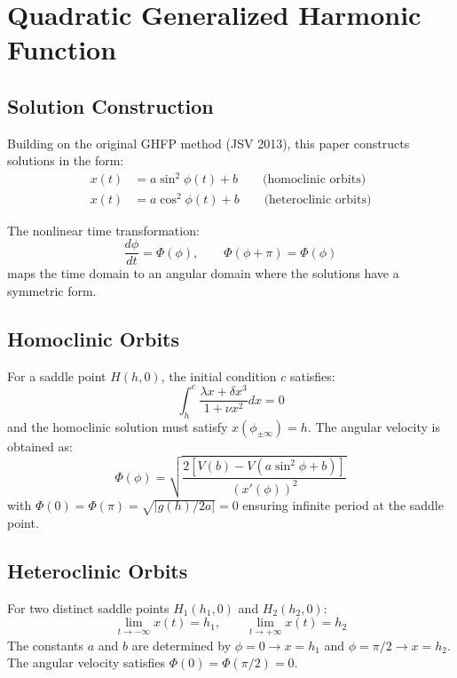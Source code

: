 \documentclass[11pt,a4paper]{article}
\begin{document}
\section{Quadratic Generalized Harmonic Function}

\subsection{Solution Construction}

Building on the original GHFP method (JSV 2013), this paper constructs solutions in the form:
\begin{align}
x(t) &= a\sin^2\phi(t) + b \qquad \text{(homoclinic orbits)}\\
x(t) &= a\cos^2\phi(t) + b \qquad \text{(heteroclinic orbits)}
\label{eq:construction}
\end{align}

The nonlinear time transformation:
\begin{equation}
\frac{d\phi}{dt} = \Phi(\phi), \qquad \Phi(\phi + \pi) = \Phi(\phi)
\label{eq:NTT}
\end{equation}
maps the time domain to an angular domain where the solutions have a symmetric form.

\subsection{Homoclinic Orbits}

For a saddle point $H(h,0)$, the initial condition $c$ satisfies:
\begin{equation}
\int_h^c \frac{\lambda x + \delta x^3}{1 + \nu x^2} dx = 0
\label{eq:homoclinic_int}
\end{equation}
and the homoclinic solution must satisfy $x(\phi_{\pm\infty}) = h$. The angular velocity is obtained as:
\begin{equation}
\Phi(\phi) = \sqrt{\frac{2[V(b) - V(a\sin^2\phi + b)]}{(x'(\phi))^2}}
\label{eq:Phi_h}
\end{equation}
with $\Phi(0) = \Phi(\pi) = \sqrt{|g(h)/2a|} = 0$ ensuring infinite period at the saddle point.

\subsection{Heteroclinic Orbits}

For two distinct saddle points $H_1(h_1, 0)$ and $H_2(h_2, 0)$:
\begin{equation}
\lim_{t\to -\infty} x(t) = h_1, \qquad \lim_{t\to +\infty} x(t) = h_2
\label{eq:heteroclinic_limits}
\end{equation}
The constants $a$ and $b$ are determined by $\phi = 0 \to x = h_1$ and $\phi = \pi/2 \to x = h_2$. The angular velocity satisfies $\Phi(0) = \Phi(\pi/2) = 0$.
\end{document}
